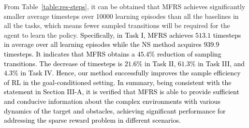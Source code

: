 \documentclass[journal]{IEEEtran}
\begin{document}
From Table~\ref{table:res-steps}, it can be obtained that MFRS achieves significantly smaller average timesteps over 10000 learning episodes than all the baselines in all the tasks, which means fewer sampled transitions will be required for the agent to learn the policy. 
\textcolor{black}{Specifically, in Task I, MFRS achieves $513.1$ timesteps in average over all learning episodes while the NS method acquires $939.9$ timesteps.
It indicates that MFRS obtains a $45.4\%$ reduction of sampling transitions.
The decrease of timesteps is $21.6\%$ in Task II, $61.3\%$ in Task III, and $4.3\%$ in Task IV.
Hence, our method successfully improves the sample efficiency of RL in the goal-conditioned setting.
In summary, being consistent with the statement in Section III-A, it is verified that MFRS is able to provide sufficient and conducive information about the complex environments with various dynamics of the target and obstacles, achieving significant performance for addressing the sparse reward problem in different scenarios.}
\end{document}
